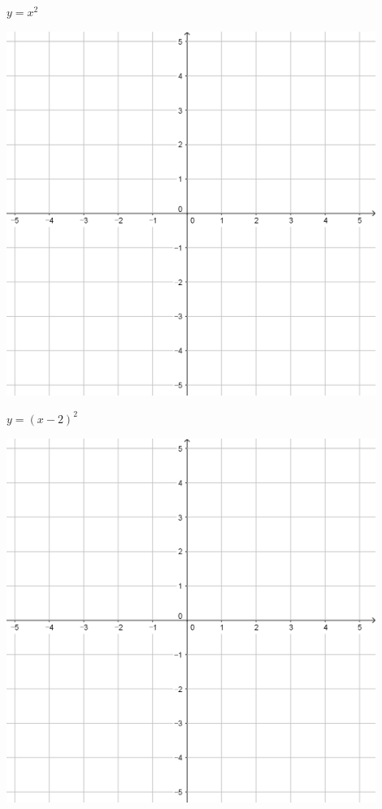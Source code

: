 \documentclass[a4paper]{oblivoir}
\begin{document}
\clearpage
\begin{minipage}{0.45\textwidth}\centering
\(y=x^2\)
\par\bigskip\includegraphics[width=0.9\textwidth]{55}
\end{minipage}
\begin{minipage}{0.45\textwidth}\centering
\(y=(x-2)^2\)
\par\bigskip\includegraphics[width=0.9\textwidth]{55}
\end{minipage}\bigskip\bigskip\par
\end{document}
